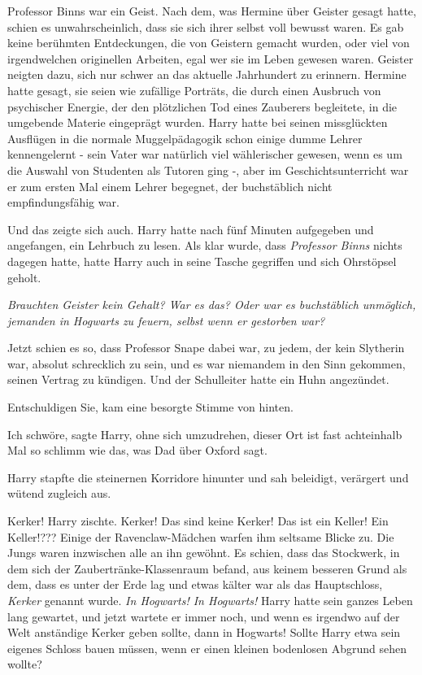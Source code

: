 Professor Binns war ein Geist. Nach dem, was Hermine über Geister gesagt hatte,
schien es unwahrscheinlich, dass sie sich ihrer selbst voll bewusst waren. Es
gab keine berühmten Entdeckungen, die von Geistern gemacht wurden, oder viel von
irgendwelchen originellen Arbeiten, egal wer sie im Leben gewesen waren. Geister
neigten dazu, sich nur schwer an das aktuelle Jahrhundert zu erinnern. Hermine
hatte gesagt, sie seien wie zufällige Porträts, die durch einen Ausbruch von
psychischer Energie, der den plötzlichen Tod eines Zauberers begleitete, in die
umgebende Materie eingeprägt wurden. Harry hatte bei seinen missglückten
Ausflügen in die normale Muggelpädagogik schon einige dumme Lehrer kennengelernt
- sein Vater war natürlich viel wählerischer gewesen, wenn es um die Auswahl von
Studenten als Tutoren ging -, aber im Geschichtsunterricht war er zum ersten Mal
einem Lehrer begegnet, der buchstäblich nicht empfindungsfähig war.

Und das zeigte sich auch. Harry hatte nach fünf Minuten aufgegeben und
angefangen, ein Lehrbuch zu lesen. Als klar wurde, dass \emph{\glqq{}Professor
Binns\grqq{}} nichts dagegen hatte, hatte Harry auch in seine Tasche gegriffen
und sich Ohrstöpsel geholt.

\emph{Brauchten Geister kein Gehalt? War es das? Oder war es buchstäblich
unmöglich, jemanden in Hogwarts zu feuern, selbst wenn er gestorben war?}

Jetzt schien es so, dass Professor Snape dabei war, zu jedem, der kein Slytherin
war, absolut schrecklich zu sein, und es war niemandem in den Sinn gekommen,
seinen Vertrag zu kündigen. Und der Schulleiter hatte ein Huhn angezündet.

\glqq{}Entschuldigen Sie\grqq{}, kam eine besorgte Stimme von hinten.

\glqq{}Ich schwöre\grqq{}, sagte Harry, ohne sich umzudrehen, \glqq{}dieser Ort
ist fast achteinhalb Mal so schlimm wie das, was Dad über Oxford sagt.\grqq{}

Harry stapfte die steinernen Korridore hinunter und sah beleidigt, verärgert und
wütend zugleich aus.

\glqq{}Kerker!\grqq{} Harry zischte. \glqq{}Kerker! Das sind keine Kerker! Das ist
ein Keller! Ein Keller!???\grqq{} Einige der Ravenclaw-Mädchen warfen ihm
seltsame Blicke zu. Die Jungs waren inzwischen alle an ihn gewöhnt. Es schien,
dass das Stockwerk, in dem sich der Zaubertränke-Klassenraum befand, aus keinem
besseren Grund als dem, dass es unter der Erde lag und etwas kälter war als das
Hauptschloss, \emph{\glqq{}Kerker\grqq{}} genannt wurde. \emph{In Hogwarts! In
Hogwarts!} Harry hatte sein ganzes Leben lang gewartet, und jetzt wartete er
immer noch, und wenn es irgendwo auf der Welt anständige Kerker geben sollte,
dann in Hogwarts! Sollte Harry etwa sein eigenes Schloss bauen müssen, wenn er
einen kleinen bodenlosen Abgrund sehen wollte?

